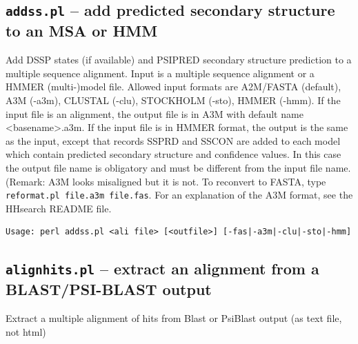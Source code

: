 \documentclass[11pt,a4paper]{article}
\begin{document}
\subsection{{\tt addss.pl} -- add predicted secondary structure to an MSA or HMM}
Add DSSP states (if available) and PSIPRED secondary structure prediction to a multiple sequence alignment.
Input is a  multiple sequence alignment or a HMMER (multi-)model file. Allowed input formats are 
A2M/FASTA (default), A3M (-a3m), CLUSTAL (-clu), STOCKHOLM (-sto), HMMER (-hmm).
If the input file is an alignment, the output file is in A3M with default name <basename>.a3m.
If the input file is in HMMER format, the output is the same as the input, except that records 
SSPRD and SSCON are added to each model which contain predicted secondary structure and 
confidence values. In this case the output file name is obligatory and must be different from the 
input file name. (Remark: A3M looks misaligned but it is not. To reconvert to FASTA, type  
\verb`reformat.pl file.a3m file.fas`. For an explanation of the A3M format, see the HHsearch 
README file.     

\small \begin{verbatim}
Usage: perl addss.pl <ali file> [<outfile>] [-fas|-a3m|-clu|-sto|-hmm] 
\end{verbatim} \normalsize


\subsection{{\tt alignhits.pl} -- extract an alignment from a BLAST/PSI-BLAST output}

Extract a multiple alignment of hits from Blast or PsiBlast output (as text file, not html)
\end{document}
